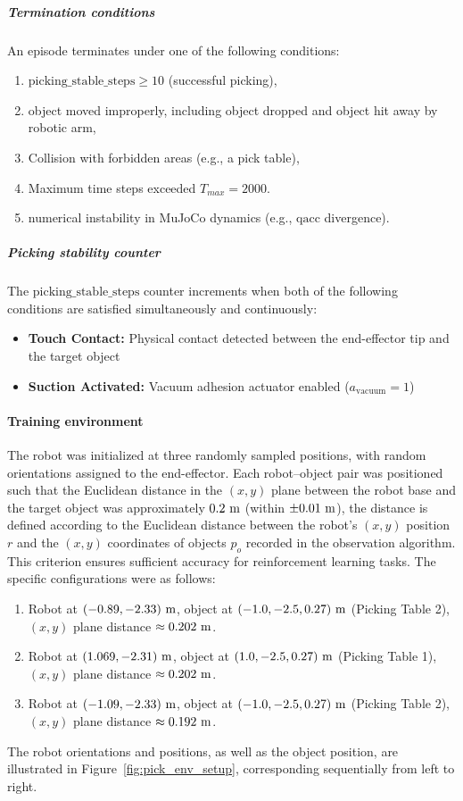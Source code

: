 \documentclass[english, 12pt, a4paper, elec, utf8, a-2b, online]{aaltothesis}
\begin{document}
\subparagraph{Termination conditions}
An episode terminates under one of the following conditions:
\begin{enumerate}
    \item $\text{picking\_stable\_steps} \geq 10$ (successful picking),
    \item object moved improperly, including object dropped and object hit away by robotic arm,
    \item Collision with forbidden areas (e.g., a pick table),
    \item Maximum time steps exceeded $T_{max} = 2000$.
    \item numerical instability in MuJoCo dynamics (e.g., $\text{qacc}$ divergence).
\end{enumerate}

\subparagraph{Picking stability counter}
The $\text{picking\_stable\_steps}$ counter increments when both of the following conditions are satisfied simultaneously and continuously:
\begin{itemize}
    \item \textbf{Touch Contact:} Physical contact detected between the end-effector tip and the target object
    \item \textbf{Suction Activated:} Vacuum adhesion actuator enabled ($a_{\text{vacuum}} = 1$)
\end{itemize}

\paragraph{Training environment}
The robot was initialized at three randomly sampled positions, with random orientations assigned to the end-effector. Each robot–object pair was positioned such that the Euclidean distance in the $(x,y)$ plane between the robot base and the target object was approximately $0.2\,\text{\,m}$ (within $\pm 0.01\,\text{\,m}$), the distance is defined according to the Euclidean distance between the robot's $(x, y)$ position $r$ and the $(x, y)$ coordinates of objects $p_o$ recorded in the observation algorithm. This criterion ensures sufficient accuracy for reinforcement learning tasks. The specific configurations were as follows:
\begin{enumerate}
\item Robot at $(-0.89, -2.33)\,\text{\,m}$, object at $(-1.0, -2.5, 0.27)\,\text{\,m}$ (Picking Table 2), $(x,y)$ plane distance $\approx 0.202\,\text{\,m}$.
\item Robot at $(1.069, -2.31)\,\text{\,m}$, object at $(1.0, -2.5, 0.27)\,\text{\,m}$ (Picking Table 1), $(x,y)$ plane distance $\approx 0.202\,\text{\,m}$.
\item Robot at $(-1.09, -2.33)\,\text{\,m}$, object at $(-1.0, -2.5, 0.27)\,\text{\,m}$ (Picking Table 2), $(x,y)$ plane distance $\approx 0.192\,\text{\,m}$.
\end{enumerate}
The robot orientations and positions, as well as the object position, are illustrated in Figure~\ref{fig:pick_env_setup}, corresponding sequentially from left to right.
\end{document}
